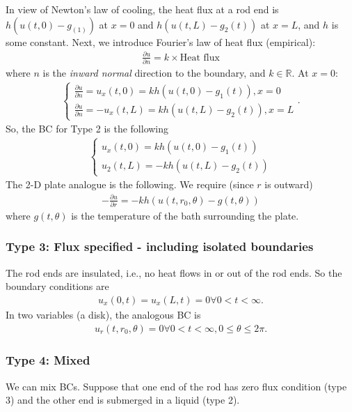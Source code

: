 \documentclass{article}
\theoremstyle{definition}
\newcommand{\p}{\partial}
\newcommand{\R}{\mathbb{R}}
\begin{document}
In view of Newton's law of cooling, the heat flux at a rod end is $h(u(t,0) - g_(1))$ at $x=0$ and $h(u(t,L)-g_2(t))$ at $x=L$, and $h$ is some constant. Next, we introduce Fourier's law of heat flux (empirical):
\begin{align*}
\frac{\p u}{\p n} = k \times\text{Heat flux}
\end{align*}
where $n$ is the \textit{inward normal} direction to the boundary, and $k\in\R$. At $x=0$:
\begin{align*}
\begin{cases*}
\frac{\p u}{\p n} = u_x(t,0) = kh(u(t,0)-g_1(t)), x=0\\
\frac{\p u}{\p n} = -u_x(t,L) = kh(u(t,L)-g_2(t)), x=L
\end{cases*}.
\end{align*}
So, the BC for Type 2 is the following
\begin{align*}
\begin{cases*}
u_x(t,0) = kh(u(t,0) - g_1(t))\\
u_2(t,L) = -kh(u(t,L) - g_2(t))
\end{cases*}
\end{align*}
The 2-D plate analogue is the following. We require (since $r$ is outward)
\begin{align*}
-\frac{\p u}{\p r} = -kh(u(t,r_0,\theta) - g(t,\theta))
\end{align*}
where $g(t,\theta)$ is the temperature of the bath surrounding the plate. 


\subsubsection{Type 3: Flux specified - including isolated boundaries} 
The rod ends are insulated, i.e., no heat flows in or out of the rod ends. So the boundary conditions are
\begin{align*}
u_x(0,t) = u_x(L,t) = 0 \forall 0 < t < \infty.
\end{align*}
In two variables (a disk), the analogous BC is
\begin{align*}
u_r(t,r_0,\theta) = 0 \forall 0 < t < \infty, 0\leq \theta \leq 2\pi.
\end{align*}
\subsubsection{Type 4: Mixed}
We can mix BCs. Suppose that one end of the rod has zero flux condition (type 3) and the other end is submerged in a liquid (type 2).
\end{document}
